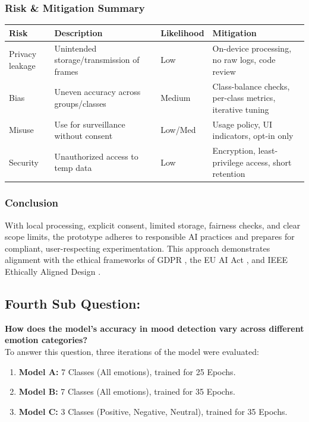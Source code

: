 \documentclass[12pt,a4paper]{article}
\begin{document}
\subsubsection*{Risk \& Mitigation Summary}
\begin{table}[H]
\centering
\small
\begin{tabularx}{\textwidth}{@{}lXlX@{}}
\toprule
\textbf{Risk} & \textbf{Description} & \textbf{Likelihood} & \textbf{Mitigation} \\
\midrule
Privacy leakage & Unintended storage/transmission of frames & Low & On-device processing, no raw logs, code review \\
Bias & Uneven accuracy across groups/classes & Medium & Class-balance checks, per-class metrics, iterative tuning \\
Misuse & Use for surveillance without consent & Low/Med & Usage policy, UI indicators, opt-in only \\
Security & Unauthorized access to temp data & Low & Encryption, least-privilege access, short retention \\
\bottomrule
\end{tabularx}
\end{table}

\subsubsection{Conclusion}
With local processing, explicit consent, limited storage, fairness checks, and clear scope limits, the prototype adheres to responsible AI practices and prepares for compliant, user-respecting experimentation. This approach demonstrates alignment with the ethical frameworks of GDPR \cite{gdpr}, the EU AI Act \cite{aiact}, and IEEE Ethically Aligned Design \cite{ieee}.


\subsection{Fourth Sub Question:}
\textbf{How does the model's accuracy in mood detection vary across different emotion categories?}\\
To answer this question, three iterations of the model were evaluated:
\begin{enumerate}
    \item \textbf{Model A:} 7 Classes (All emotions), trained for 25 Epochs.
    \item \textbf{Model B:} 7 Classes (All emotions), trained for 35 Epochs.
    \item \textbf{Model C:} 3 Classes (Positive, Negative, Neutral), trained for 35 Epochs.
\end{enumerate}
\end{document}
